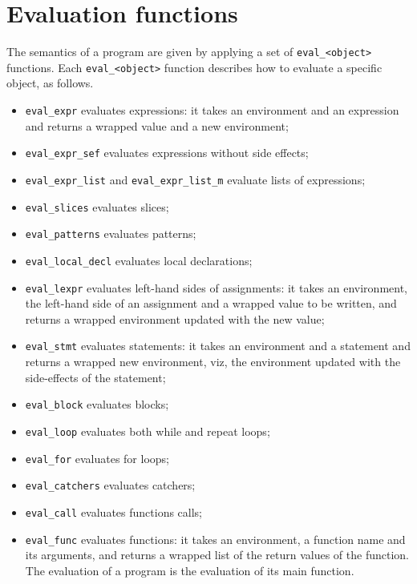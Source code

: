 \documentclass{book}
\begin{document}
\section{Evaluation functions}
The semantics of a program are given by applying a set of
\texttt{eval\_<object>} functions. Each \texttt{eval\_<object>} function
describes how to evaluate a specific object, as follows.
\begin{itemize}
\item \texttt{eval\_expr} evaluates expressions: it takes an
environment and an expression and returns a wrapped value and a
new environment;
\item \texttt{eval\_expr\_sef} evaluates expressions without side
effects;
\item \texttt{eval\_expr\_list} and \texttt{eval\_expr\_list\_m} evaluate lists
of expressions;
\item \texttt{eval\_slices} evaluates slices;
\item \texttt{eval\_patterns} evaluates patterns;
\item \texttt{eval\_local\_decl} evaluates local declarations;
\item \texttt{eval\_lexpr} evaluates left-hand sides of assignments:
it takes an environment, the left-hand side of an assignment
and a wrapped value to be written, and returns a wrapped
environment updated with the new value;
\item \texttt{eval\_stmt} evaluates statements: it takes an
environment and a statement and returns a wrapped new
environment, viz, the environment updated with the side-effects
of the statement;
\item \texttt{eval\_block} evaluates blocks;
\item \texttt{eval\_loop} evaluates both while and repeat loops;
\item \texttt{eval\_for} evaluates for loops;
\item \texttt{eval\_catchers} evaluates catchers;
\item \texttt{eval\_call} evaluates functions calls;
\item \texttt{eval\_func} evaluates functions: it takes an
environment, a function name and its arguments, and returns a
wrapped list of the return values of the function. The
evaluation of a program is the evaluation of its main function.
\end{itemize}
\end{document}
